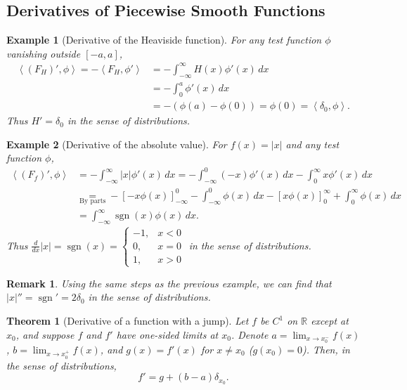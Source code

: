 \documentclass{article}
\newtheorem{theorem}{Theorem}
\newtheorem*{example}{Example}
\newtheorem{remark}{Remark}
\newcommand{\R}{\mathbb{R}}
\newcommand{\ip}[2]{\left\langle #1, #2 \right\rangle}
\newcommand{\intinf}{\int_{-\infty}^{\infty}}
\begin{document}
\subsection{Derivatives of Piecewise Smooth Functions}
\begin{example}[Derivative of the Heaviside function]
    For any test function $\phi$ vanishing outside $[-a,a]$,
    \begin{align*}
        \ip{(F_H)'}{\phi}=-\ip{F_H}{\phi'} &= -\intinf H(x)\phi'(x)\,dx\\ &= -\int_0^{a}\phi'(x)\,dx\\ &=-(\phi(a)-\phi(0)) = \phi(0) = \ip{\delta_0}{\phi}.
    \end{align*}
    Thus $H'=\delta_0$ in the sense of distributions.
\end{example}
\begin{example}[Derivative of the absolute value]
    For $f(x)=|x|$ and any test function $\phi$,
    \begin{align*}
        \ip{(F_f)'}{\phi} &= -\intinf |x|\phi'(x)\,dx = -\int_{-\infty}^{0}(-x)\phi'(x)\,dx-\int_{0}^{\infty}x\phi'(x)\,dx\\ &\underset{\text{By parts}}{=} -[-x\phi(x)]_{-\infty}^0-\int_{-\infty}^0\phi(x)\,dx - [x\phi(x)]_0^{\infty} + \int_{0}^{\infty}\phi(x)\,dx\\ &= \intinf \operatorname{sgn}(x)\phi(x)\,dx.
    \end{align*}
    Thus $\tfrac{d}{dx}|x|=\operatorname{sgn}(x)=\begin{cases}-1, & x<0\\0, & x=0\\1, & x>0\end{cases}$ in the sense of distributions.
\end{example}
\begin{remark}
    Using the same steps as the previous example, we can find that $|x|'' = \operatorname{sgn}' = 2\delta_0$ in the sense of distributions.
\end{remark}
\begin{theorem}[Derivative of a function with a jump]
    Let $f$ be $C^1$ on $\R$ except at $x_0$, and suppose $f$ and $f'$ have one-sided limits at $x_0$. Denote $a=\lim_{x\to x_0^-}f(x)$, $b=\lim_{x\to x_0^+}f(x)$, and $g(x) = f'(x)$ for $x\neq x_0$ ($g(x_0) = 0$). Then, in the sense of distributions,
    \begin{equation}
        \label{eq:jump}
        f'=g+(b-a)\delta_{x_0}.
    \end{equation}
\end{theorem}
\end{document}
